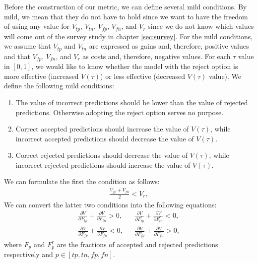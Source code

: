 %
Before the construction of our metric, we can define several mild conditions.
%
By mild, we mean that they do not have to hold since we want to have the freedom of using any value for $V_{tp}$, $V_{tn}$, $V_{fp}$, $V_{fn}$, and $V_r$ since we do not know which values will come out of the survey study in chapter \ref{sec:survey}.
%
For the mild conditions, we assume that $V_{tp}$ and $V_{tn}$ are expressed as gains and, therefore, positive values and that $V_{fp}$, $V_{fn}$, and $V_{r}$ as costs and, therefore, negative values.
%
For each $\tau$ value in $[0, 1]$, we would like to know whether the model with the reject option is more effective (increased $V(\tau)$) or less effective (decreased $V(\tau)$ value).
%
We define the following mild conditions:
\begin{enumerate}
    \item The value of incorrect predictions should be lower than the value of rejected predictions. Otherwise adopting the reject option serves no purpose.
    \item Correct accepted predictions should increase the value of $V(\tau)$, while incorrect accepted predictions should decrease the value of $V(\tau)$.
    \item Correct rejected predictions should decrease the value of $V(\tau)$, while incorrect rejected predictions should increase the value of $V(\tau)$.
\end{enumerate}
%
We can formulate the first the condition as follows:
% 
\begin{align}
    \label{for:value-condition}
    \frac{V_{fp} + V_{fn}}{2} < V_r,
\end{align}
%
We can convert the latter two conditions into the following equations:
\begin{subequations}
    \label{for:conditions}
    \begin{align}
        \frac{\partial V}{\partial F_{tp}} + \frac{\partial V}{\partial F_{tn}} > 0, &  &
        \frac{\partial V}{\partial F^r_{tp}} + \frac{\partial V}{\partial F^r_{tn}} < 0, \label{for:conditions-tp-tn} \\
        \frac{\partial V}{\partial F_{fp}} + \frac{\partial V}{\partial F_{fn}} < 0, &  &
        \frac{\partial V}{\partial F^r_{fp}} + \frac{\partial V}{\partial F^r_{fn}} > 0, \label{for:conditions-fp-fn}
    \end{align}
\end{subequations}
%
where $F_p$ and $F_p^r$ are the fractions of accepted and rejected predictions respectively and $p \in [tp, tn, fp, fn]$.
